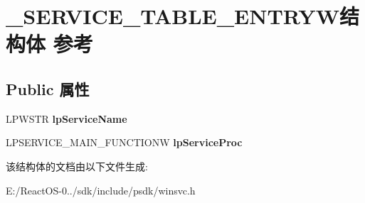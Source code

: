 \hypertarget{struct___s_e_r_v_i_c_e___t_a_b_l_e___e_n_t_r_y_w}{}\section{\+\_\+\+S\+E\+R\+V\+I\+C\+E\+\_\+\+T\+A\+B\+L\+E\+\_\+\+E\+N\+T\+R\+Y\+W结构体 参考}
\label{struct___s_e_r_v_i_c_e___t_a_b_l_e___e_n_t_r_y_w}
\subsection*{Public 属性}
\begin{DoxyCompactItemize}
\item 
\mbox{\label{struct___s_e_r_v_i_c_e___t_a_b_l_e___e_n_t_r_y_w_a32e361718655062540e7c5070ec07112}} 
L\+P\+W\+S\+TR {\bfseries lp\+Service\+Name}
\item 
\mbox{\label{struct___s_e_r_v_i_c_e___t_a_b_l_e___e_n_t_r_y_w_a3bc1f1103eea0f440aa2f887a47a7568}} 
L\+P\+S\+E\+R\+V\+I\+C\+E\+\_\+\+M\+A\+I\+N\+\_\+\+F\+U\+N\+C\+T\+I\+O\+NW {\bfseries lp\+Service\+Proc}
\end{DoxyCompactItemize}


该结构体的文档由以下文件生成\+:\begin{DoxyCompactItemize}
\item 
E\+:/\+React\+O\+S-\/0../sdk/include/psdk/winsvc.\+h\end{DoxyCompactItemize}
